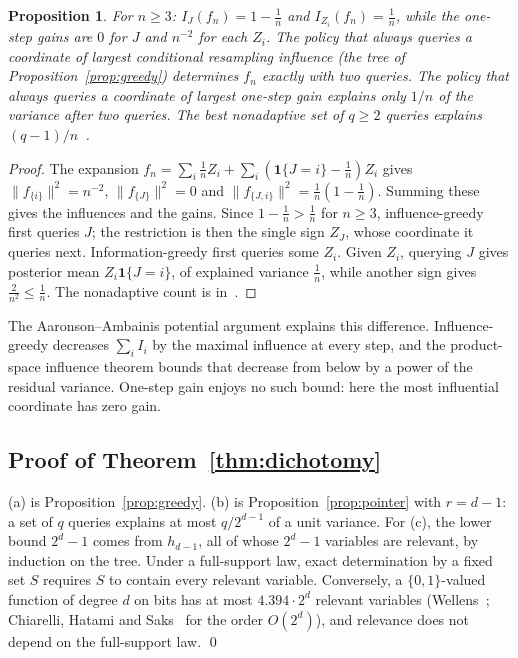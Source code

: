 \documentclass[11pt]{article}
\numberwithin{equation}{section}
\newtheorem{proposition}[theorem]{Proposition}
\theoremstyle{definition}
\theoremstyle{remark}
\newcommand{\1}{\mathbf 1}
\begin{document}
\begin{proposition}\label{prop:greedycompare}
For $n\ge3$: $I_J(f_n)=1-\frac1n$ and $I_{Z_i}(f_n)=\frac1n$, while the one-step gains are $0$ for $J$ and $n^{-2}$ for each $Z_i$. The policy that always queries a coordinate of largest conditional resampling influence (the tree of Proposition~\ref{prop:greedy}) determines $f_n$ exactly with two queries. The policy that always queries a coordinate of largest one-step gain explains only $1/n$ of the variance after two queries. The best nonadaptive set of $q\ge2$ queries explains $(q-1)/n$~\cite{WriAO}.
\end{proposition}
\begin{proof}
The expansion $f_n=\sum_i\frac1nZ_i+\sum_i(\1\{J=i\}-\frac1n)Z_i$ gives $\|f_{\{i\}}\|^2=n^{-2}$, $\|f_{\{J\}}\|^2=0$ and $\|f_{\{J,i\}}\|^2=\frac1n(1-\frac1n)$. Summing these gives the influences and the gains. Since $1-\frac1n>\frac1n$ for $n\ge3$, influence-greedy first queries $J$; the restriction is then the single sign $Z_J$, whose coordinate it queries next. Information-greedy first queries some $Z_i$. Given $Z_i$, querying $J$ gives posterior mean $Z_i\1\{J=i\}$, of explained variance $\frac1n$, while another sign gives $\frac2{n^2}\le\frac1n$. The nonadaptive count is in~\cite{WriAO}.
\end{proof}

The Aaronson--Ambainis potential argument explains this difference. Influence-greedy decreases $\sum_iI_i$ by the maximal influence at every step, and the product-space influence theorem bounds that decrease from below by a power of the residual variance. One-step gain enjoys no such bound: here the most influential coordinate has zero gain.

\subsection{Proof of Theorem~\ref{thm:dichotomy}}
(a) is Proposition~\ref{prop:greedy}. (b) is Proposition~\ref{prop:pointer} with $r=d-1$: a set of $q$ queries explains at most $q/2^{d-1}$ of a unit variance. For (c), the lower bound $2^d-1$ comes from $h_{d-1}$, all of whose $2^d-1$ variables are relevant, by induction on the tree. Under a full-support law, exact determination by a fixed set $S$ requires $S$ to contain every relevant variable. Conversely, a $\{0,1\}$-valued function of degree $d$ on bits has at most $4.394\cdot2^d$ relevant variables (Wellens~\cite{Wel22}; Chiarelli, Hatami and Saks~\cite{CHS20} for the order $O(2^d)$), and relevance does not depend on the full-support law. \qed
\end{document}
